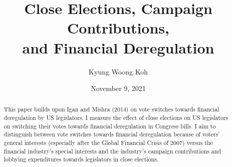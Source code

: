 \documentclass[ProjectKWK]{subfiles}
\begin{document}
\providecommand{\versn}{pdf} %
\ifthenelse{\boolean{Web}}{    %
  \renewcommand{\versn}{Web}     %
  \renewcommand{\rootFromOut}{.} %
}{}  %


\title{Close Elections, Campaign Contributions,\\ and Financial Deregulation}

\author{Kyung Woong Koh\authNum}



\renewcommand{\forcedate}{November 9, 2021}\date{\forcedate}
\maketitle
\hypertarget{abstract}{}
\begin{abstract}
This paper builds upon Igan and Mishra (2014) \cite{IM14} on vote switches towards financial deregulation by US legislators. I measure the effect of close elections on US legislators on switching their votes towards financial deregulation in Congress bills. I aim to distinguish between vote switches towards financial deregulation because of voters' general interests (especially after the Global Financial Crisis of 2007) versus the financial industry's special interests and the industry's campaign contributions and lobbying expenditures towards legislators in close elections.
\end{abstract}


\begin{authorsinfo}
\end{authorsinfo}

\newcommand{\thankstext}{
  The paper is the author's 2nd year paper for fulfillment to the PhD in Economics program at Johns Hopkins University, and also for Professor Christpher Carroll's Computational Methods course. I thank Professors Laurence Ball and Filipe Campante for comments and advice, and Deniz Igan and Prachi Mishra for sharing their data.}
\end{document}
